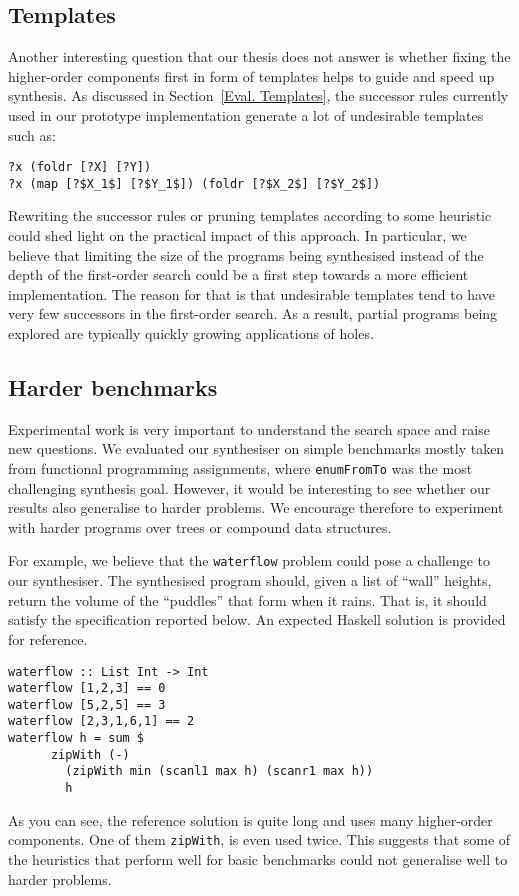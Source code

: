 \subsection{Templates}
Another interesting question that our thesis does not answer is whether fixing the higher-order components first in form of templates helps to guide and speed up synthesis. As discussed in Section~\ref{Eval. Templates}, the successor rules currently used in our prototype implementation generate a lot of undesirable templates such as:
\begin{lstlisting}[style=plain]
?x (foldr [?X] [?Y])
?x (map [?$X_1$] [?$Y_1$]) (foldr [?$X_2$] [?$Y_2$])
\end{lstlisting}
Rewriting the successor rules or pruning templates according to some heuristic could shed light on the practical impact of this approach. In particular, we believe that limiting the size of the programs being synthesised instead of the depth of the first-order search could be a first step towards a more efficient implementation. The reason for that is that undesirable templates tend to have very few successors in the first-order search. As a result, partial programs being explored are typically quickly growing applications of holes.

\subsection{Harder benchmarks}

Experimental work is very important to understand the search space and raise new questions. We evaluated our synthesiser on simple benchmarks mostly taken from functional programming assignments, where \lstinline!enumFromTo! was the most challenging synthesis goal. However, it would be interesting to see whether our results also generalise to harder problems. We encourage therefore to experiment with harder programs over trees or compound data structures.

For example, we believe that the \lstinline!waterflow! problem could pose a challenge to our synthesiser. The synthesised program should, given a list of ``wall'' heights, return the volume of the ``puddles'' that form when it rains. That is, it should satisfy the specification reported below. An expected Haskell solution is provided for reference.
\begin{lstlisting}[mathescape=false]
waterflow :: List Int -> Int
waterflow [1,2,3] == 0
waterflow [5,2,5] == 3
waterflow [2,3,1,6,1] == 2
waterflow h = sum $ 
      zipWith (-) 
        (zipWith min (scanl1 max h) (scanr1 max h))
        h
\end{lstlisting}
As you can see, the reference solution is quite long and uses many higher-order components. One of them \lstinline!zipWith!, is even used twice. This suggests that some of the heuristics that perform well for basic benchmarks could not generalise well to harder problems.







